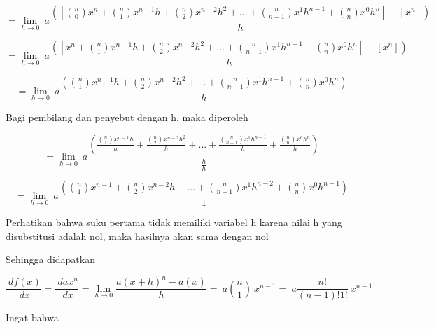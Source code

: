 \documentclass{article}
\begin{document}
\begin{eulernotebook}
\begin{eulercomment}
\begin{eulercomment}
\begin{eulercomment}
\end{eulercomment}
\begin{eulerformula}
\[
= \lim_{h\to 0} \ a \frac{([\binom{n}{0}x^{n}+\binom{n}{1}x^{n-1}h+\binom{n}{2}x^{n-2}h^{2}+...+\binom{n}{n-1}x^{1}h^{n-1}+\binom{n}{n}x^{0}h^{n}]-[x^{n}])}{h}
\]
\end{eulerformula}
\begin{eulercomment}
\end{eulercomment}
\begin{eulerformula}
\[
= \lim_{h\to 0} \ a \frac{([x^{n}+\binom{n}{1}x^{n-1}h+\binom{n}{2}x^{n-2}h^{2}+...+\binom{n}{n-1}x^{1}h^{n-1}+\binom{n}{n}x^{0}h^{n}]-[x^{n}])}{h}
\]
\end{eulerformula}
\begin{eulercomment}
\end{eulercomment}
\begin{eulerformula}
\[
= \lim_{h\to 0} \ a \frac{(\binom{n}{1}x^{n-1}h+\binom{n}{2}x^{n-2}h^{2}+...+\binom{n}{n-1}x^{1}h^{n-1}+\binom{n}{n}x^{0}h^{n})}{h}
\]
\end{eulerformula}
\begin{eulercomment}
Bagi pembilang dan penyebut dengan h, maka diperoleh

\end{eulercomment}
\begin{eulerformula}
\[
= \lim_{h\to 0} \ a \frac{(\frac{\binom{n}{1}x^{n-1}h}{h}+\frac{\binom{n}{2}x^{n-2}h^{2}}{h}+...+\frac{\binom{n}{n-1}x^{1}h^{n-1}}{h}+\frac{\binom{n}{n}x^{0}h^{n}}{h})}{\frac{h}{h}}
\]
\end{eulerformula}
\begin{eulercomment}
\end{eulercomment}
\begin{eulerformula}
\[
= \lim_{h\to 0} \ a \frac{(\binom{n}{1}x^{n-1}+\binom{n}{2}x^{n-2}h+...+\binom{n}{n-1}x^{1}h^{n-2}+\binom{n}{n}x^{0}h^{n-1})}{1}
\]
\end{eulerformula}
\begin{eulercomment}
Perhatikan bahwa suku pertama tidak memiliki variabel h karena nilai h
yang disubstitusi adalah nol, maka hasilnya akan sama dengan nol

Sehingga didapatkan

\end{eulercomment}
\begin{eulerformula}
\[
 \frac{\ df(x)}{\ dx} = \frac{\ dax^{n}}{\ dx}= \lim_{h\to 0} \frac{a(x+h)^{n}-a(x)}{h} = \ a \binom{n}{1} \ x^{n-1} = \ a \frac{n!}{(n-1)!1!} \ x^{n-1}
\]
\end{eulerformula}
\begin{eulercomment}
Ingat bahwa


\end{eulercomment}
\end{eulercomment}
\end{eulercomment}
\end{eulernotebook}
\end{document}
